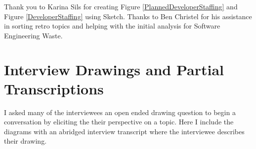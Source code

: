 \documentclass[oneside,letterpaper]{memoir}
\begin{document}
Thank you to Karina Sils for creating Figure \ref{PlannedDeveloperStaffing} and Figure \ref{DeveloperStaffing} using Sketch. Thanks to Ben Christel for his assistance in sorting retro topics and helping with the initial analysis for Software Engineering Waste.



\newpage
\tableofcontents
\listoftables
\listoffigures

\mainmatter



% 
% 
% 










\appendix


\chapter{Interview Drawings and Partial Transcriptions}
\label{AppendixInterviews}
I asked many of the interviewees an open ended drawing question to begin a conversation by eliciting the their perspective on a topic. Here I include the diagrams with an abridged interview transcript where the interviewee describes their drawing.






% 
% 



\backmatter
\end{document}

